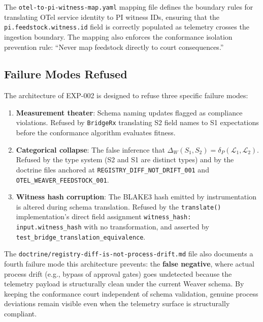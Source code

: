 The \texttt{otel-to-pi-witness-map.yaml} mapping file defines the boundary rules for
translating OTel service identity to PI witness IDs, ensuring that the
\texttt{pi.feedstock.witness.id} field is correctly populated as telemetry crosses
the ingestion boundary. The mapping also enforces the conformance isolation
prevention rule: ``Never map feedstock directly to court consequences.''

\subsection{Failure Modes Refused}
\label{sec:otel-weaver-exp-002-diff-to-residual-arch-failures}

The architecture of EXP-002 is designed to refuse three specific failure modes:

\begin{enumerate}
    \item \textbf{Measurement theater}: Schema naming updates flagged as compliance
          violations. Refused by \texttt{BridgeRx} translating S2 field names to S1
          expectations before the conformance algorithm evaluates fitness.

    \item \textbf{Categorical collapse}: The false inference that
          $\Delta_W(S_1, S_2) = \delta_P(\mathcal{L}_1, \mathcal{L}_2)$. Refused
          by the type system (S2 and S1 are distinct types) and by the doctrine
          files anchored at \texttt{REGISTRY\_DIFF\_NOT\_DRIFT\_001} and
          \texttt{OTEL\_WEAVER\_FEEDSTOCK\_001}.

    \item \textbf{Witness hash corruption}: The BLAKE3 hash emitted by
          instrumentation is altered during schema translation. Refused by the
          \texttt{translate()} implementation's direct field assignment
          \texttt{witness\_hash: input.witness\_hash} with no transformation, and
          asserted by \texttt{test\_bridge\_translation\_equivalence}.
\end{enumerate}

The \texttt{doctrine/registry-diff-is-not-process-drift.md} file also documents a
fourth failure mode this architecture prevents: the \textbf{false negative}, where
actual process drift (e.g., bypass of approval gates) goes undetected because the
telemetry payload is structurally clean under the current Weaver schema. By keeping
the conformance court independent of schema validation, genuine process deviations
remain visible even when the telemetry surface is structurally compliant.
